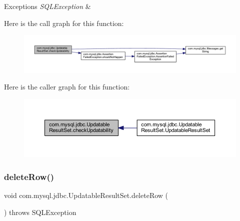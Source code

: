\begin{DoxyExceptions}{Exceptions}
{\em S\+Q\+L\+Exception} & \\
\hline
\end{DoxyExceptions}
Here is the call graph for this function\+:
\nopagebreak
\begin{figure}[H]
\begin{center}
\leavevmode
\includegraphics[width=350pt]{classcom_1_1mysql_1_1jdbc_1_1_updatable_result_set_a35f949d95ff9b1a60f1974f6f374a186_cgraph}
\end{center}
\end{figure}
Here is the caller graph for this function\+:
\nopagebreak
\begin{figure}[H]
\begin{center}
\leavevmode
\includegraphics[width=350pt]{classcom_1_1mysql_1_1jdbc_1_1_updatable_result_set_a35f949d95ff9b1a60f1974f6f374a186_icgraph}
\end{center}
\end{figure}
\mbox{\label{classcom_1_1mysql_1_1jdbc_1_1_updatable_result_set_a921d48d8e5c7adfde7518475024d822f}} 
\subsubsection{\texorpdfstring{delete\+Row()}{deleteRow()}}
{\footnotesize\ttfamily void com.\+mysql.\+jdbc.\+Updatable\+Result\+Set.\+delete\+Row (\begin{DoxyParamCaption}{ }\end{DoxyParamCaption}) throws S\+Q\+L\+Exception}

